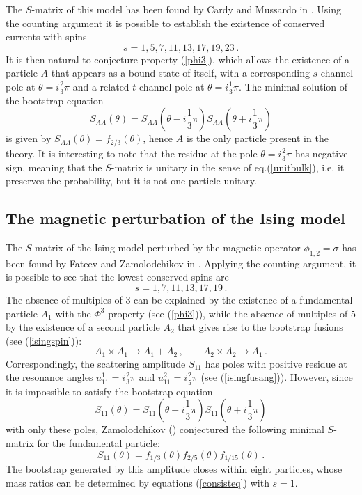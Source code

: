 \documentclass[a4paper,12pt]{report}
\begin{document}
The $S$-matrix of this model has been found by Cardy and Mussardo in \cite{SYL}. Using the counting argument it is
possible to establish the existence of conserved currents with spins
\begin{equation}
s=1,5,7,11,13,17,19,23\,.
\end{equation}
It is then natural to conjecture property (\ref{phi3}), which allows the existence of a particle $A$ that appears
as a bound state of itself, with a corresponding $s$-channel pole at $\theta=i\frac{2}{3}\pi$ and a related
$t$-channel pole at $\theta=i\frac{1}{3}\pi$. The minimal solution of the bootstrap equation
\begin{equation}
S_{AA}(\theta)=S_{AA}\left(\theta-i\frac{1}{3}\pi\right)S_{AA}\left(\theta+i\frac{1}{3}\pi\right)
\end{equation}
is given by $S_{AA}(\theta)=f_{2/3}(\theta)$, hence $A$ is the only particle present in the theory. It is
interesting to note that the residue at the pole $\theta=i\frac{2}{3}\pi$ has negative sign, meaning that the
$S$-matrix is unitary in the sense of eq.(\ref{unitbulk}), i.e. it preserves the probability, but it is not
one-particle unitary.

\subsection{The magnetic perturbation of the Ising model}

The $S$-matrix of the Ising model perturbed by the magnetic operator $\phi_{1,2}=\sigma$ has been found by Fateev
and Zamolodchikov in \cite{fatzam}. Applying the counting argument, it is possible to see that the lowest
conserved spins are
\begin{equation}
s=1,7,11,13,17,19\,.
\end{equation}
The absence of multiples of 3 can be explained by the existence of a fundamental particle $A_{1}$ with the
$\Phi^{3}$ property (see (\ref{phi3})), while the absence of multiples of 5 by the existence of a second particle
$A_{2}$ that gives rise to the bootstrap fusions (see (\ref{isingspin})):
\begin{equation}
A_{1}\times A_{1}\rightarrow A_{1}+A_{2}\,,\qquad A_{2}\times A_{2}\rightarrow A_{1}\,.
\end{equation}
Correspondingly, the scattering amplitude $S_{11}$ has poles with positive residue at the resonance angles
$u_{11}^{1}=i\frac{2}{3}\pi$ and $u_{11}^{2}=i\frac{2}{5}\pi$ (see (\ref{isingfusang})). However, since it is
impossible to satisfy the bootstrap equation
\begin{equation}
S_{11}(\theta)=S_{11}\left(\theta-i\frac{1}{3}\pi\right)S_{11}\left(\theta+i\frac{1}{3}\pi\right)
\end{equation}
with only these poles, Zamolodchikov (\cite{sbrind}) conjectured the following minimal $S$-matrix for the
fundamental particle:
\begin{equation}
S_{11}(\theta)=f_{1/3}(\theta)f_{2/5}(\theta)f_{1/15}(\theta)\,.
\end{equation}
The bootstrap generated by this amplitude closes within eight particles, whose mass ratios can be determined by
equations (\ref{consisteq}) with $s=1$.
\end{document}
